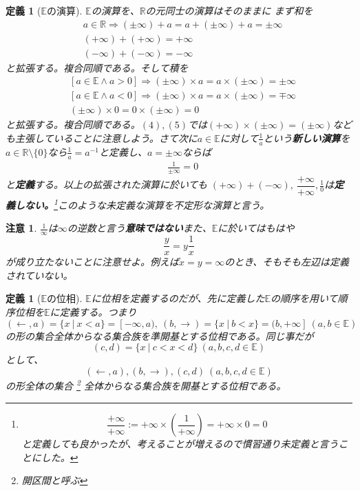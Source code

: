 \documentclass[leqno]{jsarticle}
\newtheorem{df}[thm]{定義}
\newtheorem*{cau}{注意}
\newcommand{\To}{\Longrightarrow}
\newcommand{\rr}{\mathbb{R}}
\newcommand{\mgn}{\infty}
\newcommand{\dpst}{\displaystyle}
\newcommand{\rrr}{\mathbb{E}}
\begin{document}
\begin{df}[$\rrr$の演算]
$\rrr$の演算を、$\rr$の元同士の演算はそのままに
まず和を
\begin{eqnarray}
&a\in \rr \To (\pm\mgn)+a=a+(\pm\mgn)+a=\pm\mgn\\ 
&(+\mgn)+(+\mgn)=+\mgn\\ 
&(-\mgn)+(-\mgn)=-\mgn
\end{eqnarray}
と拡張する。複合同順である。そして積を
\begin{eqnarray}
&[a\in \rrr\land a>0]\To (\pm \mgn )\times a=a\times(\pm\mgn)=\pm\mgn\\ 
&[a\in \rrr\land a<0]\To (\pm\mgn)\times a=a\times(\pm\mgn)=\mp\mgn\\ 
&(\pm\mgn)\times 0=0\times (\pm\mgn)=0
\end{eqnarray}
と拡張する。複合同順である。$(4),(5)$では$
(+\mgn)\times (\pm\mgn)=(\pm\mgn)$なども主張していることに注意しよう。さて次に$a\in \rrr$に対して$\dpst \frac{1}{a}$という{\bf 新しい演算}を$a\in \rr\setminus \{0\}$なら$\dpst \frac{1}{a}=a^{-1}$と定義し、$a=\pm \mgn$ならば
\begin{eqnarray}
&\frac{1}{\pm\mgn}=0
\end{eqnarray}と{\bf 定義}する。以上の拡張された演算に於いても
$\dpst (+\mgn)+(-\mgn),\ \dfrac{+\mgn}{+\mgn},
\frac{1}{0}$は{\bf 定義しない。}\footnote{\[\frac{+\mgn}{+\mgn}:=+\mgn\times \left(\frac{1}{+\mgn}\right)=+\mgn\times 0=0\]と定義しても良かったが、考えることが増えるので慣習通り未定義と言うことにした。}このような未定義な演算を不定形な演算と言う。
\end{df}
\begin{cau}
$\dpst \frac{1}{\mgn}$は$\mgn$の逆数と言う{\bf 意味ではない}また、$\rrr$に於いてはもはや
\[
\frac{y}{x}=y\frac{1}{x}
\]
が成り立たないことに注意せよ。例えば$x=y=\mgn$のとき、そもそも左辺は定義されていない。
\end{cau}



\begin{df}[$\rrr$の位相]
$\rrr$に位相を定義するのだが、先に定義した$\rrr$の順序を用いて順序位相を$\rrr$に定義する。つまり
\[
(\gets,a)=\{x\ |\ x<a\}=[-\mgn,a),\ (b,\to)=\{x\ |\ b<x\}=(b,+\mgn]\ (a,b\in\rrr)
\]
の形の集合全体からなる集合族を準開基とする位相である。同じ事だが
\[
(c,d)=\{x\ |\ c<x<d\}\ (a,b,c,d\in\rrr)
\]
として、
\[
(\gets,a),(b,\to),(c,d)\ (a,b,c,d\in\rrr)
\]
の形全体の集合
	\footnote{開区間と呼ぶ}
全体からなる集合族を開基とする位相である。
\end{df}
\end{document}
